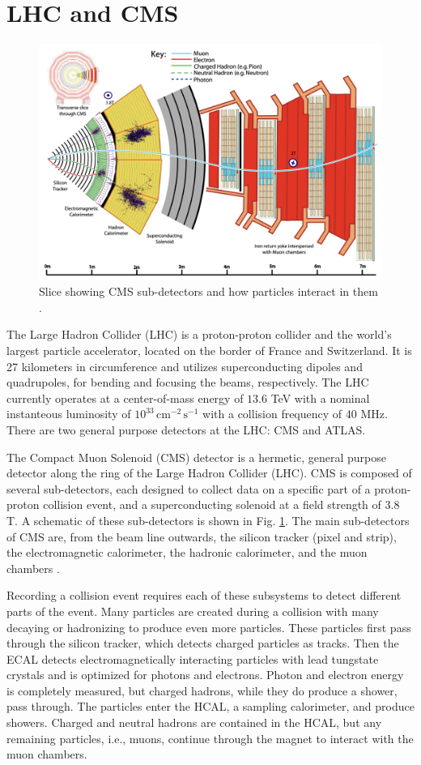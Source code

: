 \documentclass[12pt]{article}
\begin{document}
\section{LHC and CMS}
\begin{figure}
   \centering
   \includegraphics[width=0.6\linewidth]{figures/CMSslice_whiteBackground.png}
   \caption{Slice showing CMS sub-detectors and how particles interact in them \cite{particle_flow_2017}.}
   \label{fig:cms-subdetectors}
\end{figure}

The Large Hadron Collider (LHC) is a proton-proton collider and the world's largest particle accelerator, located on the border of France and Switzerland. It is 27 kilometers in circumference and utilizes superconducting dipoles and quadrupoles, for bending and focusing the beams, respectively. The LHC currently operates at a center-of-mass energy of $13.6$ TeV with a nominal instanteous luminosity of $10^{33}\, \text{cm}^{-2}\, \text{s}^{-1}$ with a collision frequency of 40 MHz. There are two general purpose detectors at the LHC: CMS and ATLAS.\par

The Compact Muon Solenoid (CMS) detector is a hermetic, general purpose detector along the ring of the Large Hadron Collider (LHC). CMS is composed of several sub-detectors, each designed to collect data on a specific part of a proton-proton collision event, and a superconducting solenoid at a field strength of $3.8$ T. A schematic of these sub-detectors is shown in Fig. \ref{fig:cms-subdetectors}. The main sub-detectors of CMS are, from the beam line outwards, the silicon tracker (pixel and strip), the electromagnetic calorimeter, the hadronic calorimeter, and the muon chambers \cite{CMS_Collaboration_2008}.\par

Recording a collision event requires each of these subsystems to detect different parts of the event. Many particles are created during a collision with many decaying or hadronizing to produce even more particles. These particles first pass through the silicon tracker, which detects charged particles as tracks. Then the ECAL detects electromagnetically interacting particles with lead tungstate crystals and is optimized for photons and electrons. Photon and electron energy is completely measured, but charged hadrons, while they do produce a shower, pass through. The particles enter the HCAL, a sampling calorimeter, and produce showers. Charged and neutral hadrons are contained in the HCAL, but any remaining particles, i.e., muons, continue through the magnet to interact with the muon chambers.\par
\end{document}
